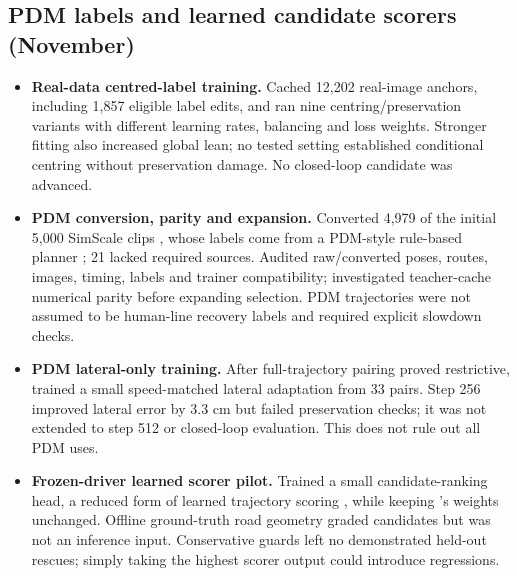 \subsection{PDM labels and learned candidate scorers (November)}
\begin{itemize}\setlength{\itemsep}{3pt}\setlength{\parsep}{0pt}\setlength{\parskip}{0pt}\setlength{\topsep}{3pt}
\item \textbf{Real-data centred-label training.} Cached 12,202 real-image anchors, including 1,857 eligible label edits, and ran nine centring/preservation variants with different learning rates, balancing and loss weights. Stronger fitting also increased global lean; no tested setting established conditional centring without preservation damage. No closed-loop candidate was advanced.
\item \textbf{PDM conversion, parity and expansion.} Converted 4,979 of the initial 5,000 SimScale clips \cite{simscale}, whose labels come from a PDM-style rule-based planner \cite{pdm}; 21 lacked required sources. Audited raw/converted poses, routes, images, timing, labels and trainer compatibility; investigated teacher-cache numerical parity before expanding selection. PDM trajectories were not assumed to be human-line recovery labels and required explicit slowdown checks.
\item \textbf{PDM lateral-only training.} After full-trajectory pairing proved restrictive, trained a small speed-matched lateral adaptation from 33 pairs. Step 256 improved lateral error by 3.3 cm but failed preservation checks; it was not extended to step 512 or closed-loop evaluation. This does not rule out all PDM uses.
\item \textbf{Frozen-driver learned scorer pilot.} Trained a small candidate-ranking head, a reduced form of learned trajectory scoring \cite{hydramdp,gtrs}, while keeping \lf{}'s weights unchanged. Offline ground-truth road geometry graded candidates but was not an inference input. Conservative guards left no demonstrated held-out rescues; simply taking the highest scorer output could introduce regressions.

\end{itemize}
